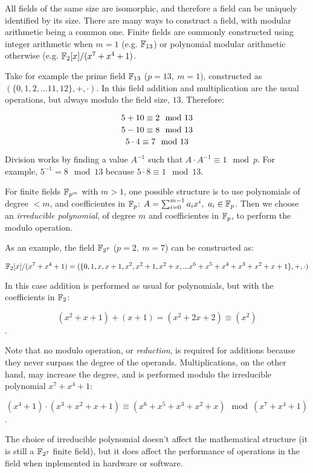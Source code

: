 All fields of the same size are isomorphic, and therefore a field can be uniquely identified by its size. There are many ways to construct a field, with modular arithmetic being a common one. Finite fields are commonly constructed using integer arithmetic when $m=1$ (e.g. $\mathbb{F}_{13}$) or polynomial modular arithmetic otherwise (e.g. $\mathbb{F}_{2}[x]/(x^7+x^4+1)$.

Take for example the prime field $\mathbb{F}_{13}$ ($p=13,~m=1$), constructed as $(\{0, 1, 2, ... 11, 12\}, +, \cdot)$. In this field addition and multiplication are the usual operations, but always modulo the field size, $13$. Therefore:

$$5 + 10 \equiv 2 \mod 13 \\$$
$$5 - 10 \equiv 8 \mod 13 \\$$
$$5 \cdot 4 \equiv 7 \mod 13 \\$$

Division works by finding a value $A^{-1}$ such that $A \cdot A^{-1} \equiv 1 \mod p$. For example, $5^{-1} = 8 \mod 13$ because $5 \cdot 8 \equiv 1 \mod 13$.

For finite fields $\mathbb{F}_{p^m}$ with $m > 1$, one possible structure is to use polynomials of degree $<m$, and coefficientes in $\mathbb{F}_{p}$: $A = \sum_{i=0}^{m-1} a_i x^i,~a_i \in \mathbb{F}_{p}$. Then we choose an \emph{irreducible polynomial}, of degree $m$ and coefficientes in $\mathbb{F}_{p}$, to perform the modulo operation.

As an example, the field $\mathbb{F}_{2^7}$ ($p=2,~m=7$) can be constructed as:

$$\mathbb{F}_{2}[x]/(x^7+x^4+1) = (\{0, 1, x, x+1, x^2, x^2+1, x^2+x, ... x^6+x^5+x^4+x^3+x^2+x+1\}, +, \cdot)$$

In this case addition is performed as usual for polynomials, but with the coefficients in $\mathbb{F}_2$:

$$(x^2+x+1) + (x+1) = (x^2+2x+2) \equiv (x^2)$$.

Note that no modulo operation, or \emph{reduction}, is required for additions because they never surpass the degree of the operands. Multiplications, on the other hand, may increase the degree, and is performed modulo the irreducible polynomial $x^7+x^4+1$:

$$(x^4+1) \cdot (x^3+x^2+x+1) \equiv (x^6+x^5+x^3+x^2+x) \mod (x^7+x^4+1)$$.

The choice of irreducible polynomial doesn't affect the mathematical structure (it is still a $\mathbb{F}_{2^7}$ finite field), but it does affect the performance of operations in the field when inplemented in hardware or software.

